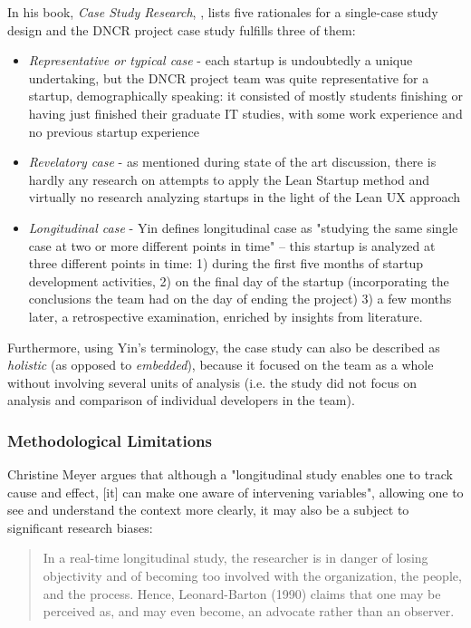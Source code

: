 \documentclass{article}
\begin{document}
In his book, \textit{Case Study Research}, \cite{yin2013case}, lists five rationales for a single-case study design and the DNCR project case study fulfills three of them:
\begin{itemize}
\item \textit{Representative or typical case} - each startup is undoubtedly a unique undertaking, but the DNCR project team was quite representative for a startup, demographically speaking: it consisted of mostly students finishing or having just finished their graduate IT studies, with some work experience and no previous startup experience
\item \textit{Revelatory case} - as mentioned during state of the art discussion, there is hardly any research on attempts to apply the Lean Startup method and virtually no research analyzing startups in the light of the Lean UX approach
\item \textit{Longitudinal case} - Yin defines longitudinal case as "studying the same single case at two or more different points in time" – this startup is analyzed at three different points in time: 1) during the first five months of startup development activities, 2) on the final day of the startup (incorporating the conclusions the team had on the day of ending the project) 3) a few months later, a retrospective examination, enriched by insights from literature.
\end{itemize}

Furthermore, using Yin's terminology, the case study can also be described as \textit{holistic} (as opposed to \textit{embedded}), because it focused on the team as a whole without involving several units of analysis (i.e. the study did not focus on analysis and comparison of individual developers in the team).

\subsubsection{Methodological Limitations}
Christine Meyer \citep{meyer2001case} argues that although a "longitudinal study enables one to track cause and effect, [it] can make one aware of intervening variables", allowing one to see and understand the context more clearly, it may also be a subject to significant research biases:
\begin{quote}
In a real-time longitudinal study, the researcher is in danger of losing objectivity and of becoming too involved with the organization, the people, and the process. Hence, Leonard-Barton (1990) claims that one may be perceived as, and may even become, an advocate rather than an observer.
\end{quote}
\end{document}
